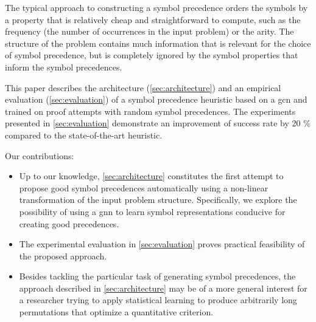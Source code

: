 The typical approach to constructing a symbol precedence orders the symbols by a property
that is relatively cheap and straightforward to compute,
such as the frequency (the number of occurrences in the input problem) \cite{E-manual} or the arity.
The structure of the problem contains much information that is relevant for the choice of symbol precedence,
but is completely ignored by the symbol properties that inform the symbol precedences.

This paper describes the architecture (\cref{sec:architecture}) and an empirical evaluation (\cref{sec:evaluation})
of a symbol precedence heuristic based on a \gls{gcn} \cite{kipf2017semisupervised}
and trained on proof attempts with random symbol precedences.
The experiments presented in \cref{sec:evaluation} demonstrate an improvement of success rate by 20 \%
compared to the state-of-the-art heuristic.


Our contributions:
\begin{itemize}
\item Up to our knowledge, \cref{sec:architecture} constitutes the first attempt
to propose good symbol precedences automatically using a non-linear transformation of the input problem structure.
Specifically, we explore the possibility of using a \gls{gnn} to learn symbol representations conducive for creating good precedences.
\item The experimental evaluation in \cref{sec:evaluation} proves practical feasibility of the proposed approach.
\item Besides tackling the particular task of generating symbol precedences,
the approach described in \cref{sec:architecture} may be of a more general interest
for a researcher trying to apply statistical learning to produce arbitrarily long permutations
that optimize a quantitative criterion.
\end{itemize}

